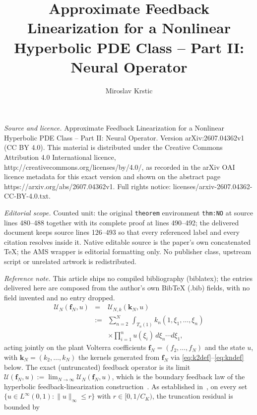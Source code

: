 \documentclass[10pt,a4paper]{amsart}
\newcommand{\Linf}{L^\infty}
\begin{document}
\title[Approximate Feedback Linearization for a Nonlinear Hyperboli]{Approximate Feedback Linearization for a Nonlinear Hyperbolic PDE Class -- Part II: Neural Operator}
\author{Miroslav Krstic}
\date{}
\maketitle
\noindent\emph{Source and licence.} Approximate Feedback Linearization for a Nonlinear Hyperbolic PDE Class -- Part II: Neural Operator. Version arXiv:2607.04362v1 (CC BY 4.0). This material is distributed under the Creative Commons Attribution 4.0 International licence, http://creativecommons.org/licenses/by/4.0/, as recorded in the arXiv OAI licence metadata for this exact version and shown on the abstract page https://arxiv.org/abs/2607.04362v1. Full rights notice: licenses/arxiv-2607.04362-CC-BY-4.0.txt.\par\smallskip
\noindent\textit{Editorial scope.} Counted unit: the original \texttt{theorem} environment \texttt{thm:NO} at source lines 480--488 together with its complete proof at lines 490--492; the delivered document keeps source lines 126--493 so that every referenced label and every citation resolves inside it. Native editable source is the paper's own concatenated TeX; the AMS wrapper is editorial formatting only. No publisher class, upstream script or unrelated artwork is redistributed.
\par\smallskip\noindent\textit{Reference note.} This article ships no compiled bibliography (biblatex); the entries delivered here are composed from the author's own BibTeX (.bib) fields, with no field invented and no entry dropped.
\begin{eqnarray}
\mathcal{U}_N(\mathbf{f}_N, u)
&=& \mathcal{U}_{N,k}(\mathbf{k}_N, u) \nonumber \\
&:=& \sum_{n=2}^{N}\, \int_{T_n(1)} k_n(1,\xi_1,\ldots,\xi_n) \nonumber \\
&& \times \prod_{i=1}^{n} u(\xi_i)\, d\xi_n\cdots d\xi_1,
\label{eq:KNdef}
\end{eqnarray}
acting jointly on the plant Volterra coefficients $\mathbf{f}_N = (f_2, \ldots, f_N)$ and the state $u$, with $\mathbf{k}_N = (k_2, \ldots, k_N)$ the kernels generated from $\mathbf{f}_N$ via \eqref{eq:k2def}--\eqref{eq:kndef} below. The exact (untruncated) feedback operator is its limit $\mathcal{U}(\mathbf{f}_N, u) := \lim_{N\to\infty} \mathcal{U}_N(\mathbf{f}_N, u)$, which is the boundary feedback law of the hyperbolic feedback-linearization construction~\cite{krstic2026feedbacklinearizationhyperbolicpdes}. As established in~\cite{krstic2026feedbacklinearizationhyperbolicpdes-trunc}, on every set $\{u \in \Linf(0,1) : \|u\|_\infty \le r\}$ with $r \in [0, 1/C_K)$, the truncation residual is bounded by
\end{document}
